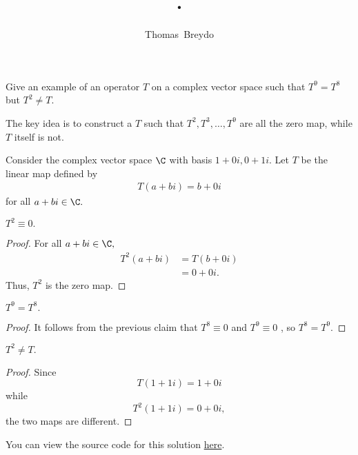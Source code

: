 \documentclass{amsart}
\title{\pagenum.\probnum}
\author{Thomas\ Breydo}
\newcommand{\pagenum}{223}
\newcommand{\probnum}{8}
\begin{document}
\maketitle

\begin{problem*}
Give an example of an operator $T$ on a complex
vector space such that $T^9=T^8$ but $T^2\ne T.$
\end{problem*}

\vspace{0.5in}

The key idea is to construct a $T$ such that $T^2,T^3,\dots,T^9$
are all the zero map, while $T$ itself is not.

Consider the complex vector space $\C$ with basis $1+0i,0+1i.$
Let $T$ be the linear map defined by
\begin{align*}
    T(a+bi)=b+0i
\end{align*}
for all $a+bi\in\C.$

\begin{claim*}
$T^2\equiv 0.$
\end{claim*}
\begin{proof}
For all $a+bi\in\C,$
\begin{align*}
    T^2(a+bi) &= T(b+0i)\\
              &= 0+0i.
\end{align*}
Thus, $T^2$ is the zero map. \end{proof}

\begin{claim*}
$T^9=T^8.$
\end{claim*}
\begin{proof}
It follows from the previous claim that $T^8\equiv 0$ and $T^9\equiv 0$
, so $T^8=T^9.$
\end{proof}

\begin{claim*}
$T^2\ne T.$
\end{claim*}
\begin{proof}
Since $$T(1+1i)=1+0i$$ while $$T^2(1+1i)=0+0i,$$ the two maps
are different.
\end{proof}
\vspace{0.5in}

\begin{note*}
You can view the source code for this solution
\href{https://github.com/thomasbreydo/linalg/blob/main/\pagenum_\probnum_Thomas_Breydo.tex}
{here}.
\end{note*}
\end{document}

